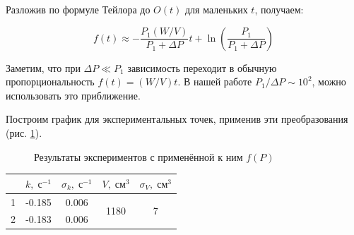 \documentclass{article}
\newcommand{\x}{\text}
\begin{document}
Разложив по формуле Тейлора до $O(t)$ для маленьких $t$, получаем:

$$ f(t) \approx -\frac{P_1 (W/V)}{P_1 + \Delta P} t + \ln\left(\frac{P_1}{P_1 + \Delta P}\right)$$

Заметим, что при $\Delta P \ll P_1$ зависимость переходит в обычную пропорциональность $f(t) = (W/V)t$. В нашей работе $P_1/\Delta P \sim 10^2$, можно использовать это приближение.

Построим график для экспериментальных точек, применив эти преобразования (рис. \ref{wawa}).

\begin{figure}[!h]
    \centering
    \hfill
    \caption{Результаты экспериментов с применённой к ним $f(P)$}
    \label{wawa}
\end{figure}

\begin{table}[h!]
    \centering
    \begin{tabular}{|c|c|c|c|c|}
        \hline
          & $k, \; \x{с}^{-1}$ & $\sigma_k, \; \x{с}^{-1}$ & $V, \; \x{см}^{3}$    & $\sigma_V, \; \x{см}^3$ \\ \hline
        1 & -0.185             & 0.006                     & \multirow{2}{*}{1180} & \multirow{2}{*}{7}      \\ \cline{1-3}
        2 & -0.183             & 0.006                     &                       &                         \\ \hline
    \end{tabular}
\end{table}
\end{document}
